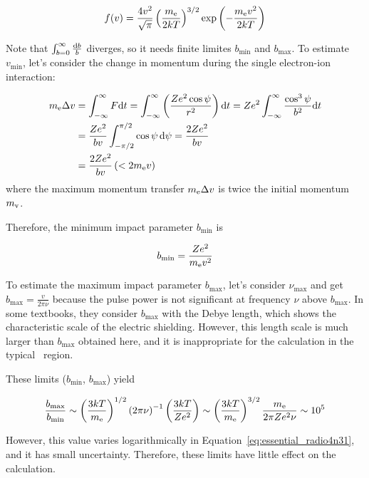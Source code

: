 \begin{equation}\label{eq:essential_radio4n34}
    f(v)=\frac{4 v^2}{\sqrt{\pi}} \left(\frac{m_{\mathrm{e}}}{2 k T}\right)^{3/2} \exp \left(-\frac{m_{\mathrm{e}} v^2}{2 k T}\right)
\end{equation}

Note that $\int^{\infty}_{b=0} \frac{\mathrm{d} b}{b}$ diverges, so it needs finite limites $b_{\min}$ and $b_{\max}$.
To estimate $v_{\min}$, let's consider the change in momentum during the single electron-ion interaction:

\begin{align}\label{eq:essential_radio4n40}
    m_{\mathrm{e}} \Delta v &= \int_{-\infty}^{\infty} F \mathrm{d} t = \int_{-\infty}^{\infty}\left(\frac{Z e^{2} \cos \psi}{r^{2}}\right) \mathrm{d} t=Z e^{2} \int_{-\infty}^{\infty} \frac{\cos ^{3} \psi}{b^{2}} \mathrm{d} t \\
                      &= \frac{Z e^{2}}{b v} \int_{-\pi / 2}^{\pi / 2} \cos \psi\,\mathrm{d} \psi=\frac{2 Z e^{2}}{b v} \\
                      &= \frac{2Ze^2}{bv} \left(< 2m_{\mathrm{e}}v\right)
\end{align}
where the maximum momentum transfer $m_{\mathrm{e}} \Delta v$ is twice the initial momentum $m_{\mathrm{v}}$.

Therefore, the minimum impact parameter $b_{\min}$ is

\begin{equation}\label{eq:essential_radio4n43}
    b_{\min} = \frac{Ze^2}{m_{\mathrm{e}}v^2}
\end{equation}

To estimate the maximum impact parameter $b_{\max}$, let's consider $\nu_{\max}$ and get $b_{\max} = \frac{v}{2\pi \nu}$ because the pulse power is not significant at frequency $\nu$ above $b_{\max}$.
In some textbooks, they consider $b_{\max}$ with the Debye length, which shows the characteristic scale of the electric shielding.
However, this length scale is much larger than $b_{\max}$ obtained here, and it is inappropriate for the calculation in the typical \ih~region.

These limits ($b_{\min}$, $b_{\max}$) yield

\begin{equation}\label{eq:essential_radio4n49}
    \frac{b_{\max }}{b_{\min }} \sim \left(\frac{3 k T}{m_{\mathrm{e}}}\right)^{1 / 2}\left(2 \pi \nu\right)^{-1}\left(\frac{3 k T}{Z e^{2}}\right) \sim \left(\frac{3 k T}{m_{\mathrm{e}}}\right)^{3 / 2} \frac{m_{\mathrm{e}}}{2 \pi Z e^{2} \nu} \sim 10^5
\end{equation}

However, this value varies logarithmically in Equation~\ref{eq:essential_radio4n31}, and it has small uncertainty.
Therefore, these limits have little effect on the calculation.

